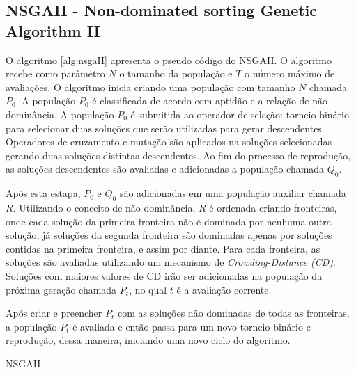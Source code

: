 \subsection{NSGAII - Non-dominated sorting Genetic Algorithm II}
\label{subsection:nsgaii}

O algoritmo \ref{alg:nsgaII} apresenta o pseudo código do NSGAII. O algoritmo recebe como parâmetro $N$ o tamanho da população e $T$ o número máximo 
de avaliações. O algoritmo inicia criando uma população com tamanho $N$ chamada $P_0$. A população $P_0$ é classificada de acordo com aptidão 
e a relação de não dominância. A população $P_0$ é submitida ao operador de seleção: torneio binário para selecionar duas soluções que serão utilizadas
para gerar descendentes. Operadores de cruzamento e mutação são aplicados na soluções selecionadas gerando duas soluções distintas descendentes. 
Ao fim do processo de reprodução, as soluções descendentes são avaliadas e adicionadas a população chamada $Q_0$.

Após esta estapa, $P_0$ e $Q_0$ são adicionadas em uma população auxiliar chamada $R$. Utilizando o conceito de não dominância, $R$ é ordenada 
criando fronteiras, onde cada solução da primeira fronteira não é dominada por nenhuma outra solução, já soluções da segunda fronteira são dominadas
apenas por soluções contidas na primeira fronteira, e assim por diante. Para cada fronteira, as soluções são avaliadas utilizando um mecanismo
de \textit{Crowding-Distance (CD)}. Soluções com maiores valores de CD irão ser adicionadas na população da próxima geração chamada $P_t$, no qual $t$ é a
avaliação corrente.

Após criar e preencher $P_t$ com as soluções não dominadas de todas as fronteiras, a população $P_t$ é avaliada e então passa para um novo
torneio binário e reprodução, dessa maneira, iniciando uma novo ciclo do algoritmo.

\begin{algorithm}[htb!]
	\begin{algorithmic}[1]
		\EndWhile
		\EndWhile
		
		\EndWhile
	\end{algorithmic}
	\caption{NSGAII}
	\label{alg:nsgaII}
\end{algorithm}



